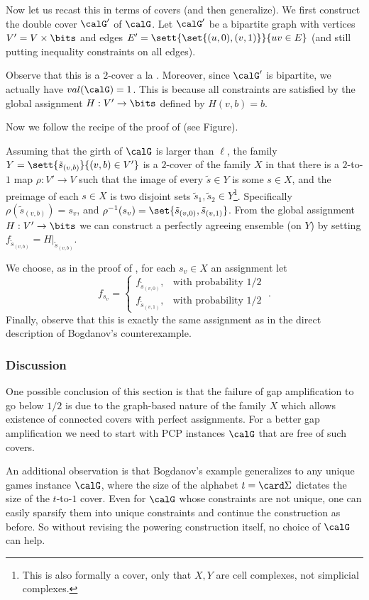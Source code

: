 Now let us recast this in terms of covers (and then generalize).
We first construct the double cover $\calG'$ of $\calG$. Let $\calG'$ be a bipartite graph with vertices $V'=V\times\bits$ and edges $E' = \sett{\set{(u,0),(v,1)} }{uv\in E}$ (and still putting inequality constraints on all edges). 
%

Observe that this is a $2$-cover a la . Moreover, since $\calG'$ is bipartite, we actually have $val(\calG)=1$. This is because all constraints are satisfied by the global assignment $H:V'\to\bits$ defined by $H(v,b)=b$.  

Now we follow the recipe of the proof of  (see Figure). 
\begin{center}
\end{center}
Assuming that the girth of $\calG$ is larger than $\ell$, the family $Y = \sett{\tilde s_{(v,b)}}{(v,b)\in V'}$ is a $2$-cover of the family $X$ in that there is a $2$-to-$1$ map $\rho:V'\to V$ such that the image of every $\tilde s\in Y$ is some $s\in X$, and the preimage of each $s\in X$ is two disjoint sets $\tilde s_1,\tilde s_2\in Y$\footnote{This is also formally a cover, only that \(X,Y\) are cell complexes, not simplicial complexes.}. Specifically $\rho(\tilde s_{(v,b)}) = s_v$, and $\rho^{-1}(s_v) = \set{\tilde s_{(v,0)},\tilde s_{(v,1)}}$.
From the global assignment $H:V'\to\bits$ we can construct a perfectly agreeing ensemble (on $Y$) by setting $ f_{\tilde s_{(v,b)}} = H|_{\tilde s_{(v,b)}}$.

We choose, as in the proof of , for each $s_v\in X$ an assignment
let \[f_{s_v}  =
\begin{cases}
			f_{\tilde s_{(v,0)}}, & \text{with probability 1/2}\\
                f_{\tilde s_{(v,1)}}, & \text{with probability 1/2}
		 \end{cases}
\;.   \]
Finally, observe that this is exactly the same assignment as in the direct description of Bogdanov's counterexample.
%
\subsubsection*{Discussion}
One possible conclusion of this section is that the failure of gap amplification to go below $1/2$ is due to the graph-based nature of the family $X$ which allows existence of connected covers with perfect assignments. For a better gap amplification we need to start with PCP instances $\calG$ that are free of such covers. 

An additional observation is that Bogdanov's example generalizes to any unique games instance $\calG$, where the size of the alphabet $t=\card \Sigma$ dictates the size of the $t$-to-$1$ cover. Even for $\calG$ whose constraints are not unique, one can easily sparsify them into unique constraints and continue the construction as before. So without revising the powering construction itself, no choice of $\calG$ can help. 